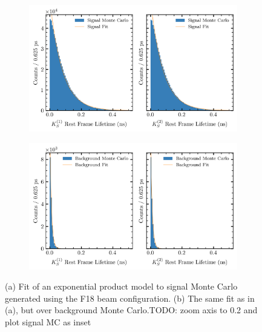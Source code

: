 \begin{figure}
  \begin{center}
    \begin{subfigure}[b]{.8\columnwidth}
      \includegraphics[width=1\linewidth]{figures/sPlot_fit_accmc_F18_fiducial@accidentals@chisqndf-4.png}
      \caption{}
      \label{fig:mc_f18_splot_fit:a}
    \end{subfigure}
    \begin{subfigure}[b]{.8\columnwidth}
      \includegraphics[width=1\linewidth]{figures/sPlot_fit_4pi_F18_fiducial@accidentals@chisqndf-4.png}
      \caption{}
      \label{fig:mc_f18_splot_fit:b}
    \end{subfigure}
  \end{center}
  \caption{(a) Fit of an exponential product model to signal Monte Carlo generated using the F18 beam configuration. (b) The same fit as in (a), but over background Monte Carlo.{\color{red}TODO: zoom axis to 0.2 and plot signal MC as inset}}\label{fig:mc_f18_splot_fit}
\end{figure}


